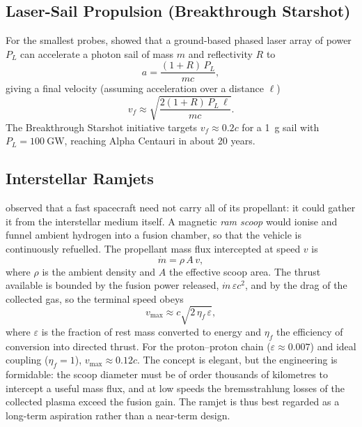 \documentclass[12pt,a4paper]{article}
\begin{document}
\subsection{Laser-Sail Propulsion (Breakthrough Starshot)}

For the smallest probes, \citet{Forward1984} showed that a ground-based phased
laser array of power $P_L$ can accelerate a photon sail of mass $m$ and
reflectivity $R$ to
\begin{equation}
  a = \frac{(1+R)\,P_L}{mc},
  \label{eq:laser_accel}
\end{equation}
giving a final velocity (assuming acceleration over a distance $\ell$)
\begin{equation}
  v_f \approx \sqrt{\frac{2(1+R)\,P_L\,\ell}{mc}}.
\end{equation}
The Breakthrough Starshot initiative targets $v_f \approx 0.2c$ for a
\SI{1}{\gram} sail with $P_L = \SI{100}{\giga\watt}$, reaching Alpha
Centauri in about 20 years.

\subsection{Interstellar Ramjets}

\citet{Bussard1960} observed that a fast spacecraft need not carry all of its
propellant: it could gather it from the interstellar medium itself. A magnetic
\emph{ram scoop} would ionise and funnel ambient hydrogen into a fusion
chamber, so that the vehicle is continuously refuelled. The propellant mass
flux intercepted at speed $v$ is
\begin{equation}
  \dot m = \rho\,A\,v,
  \label{eq:ram_flux}
\end{equation}
where $\rho$ is the ambient density and $A$ the effective scoop area. The
thrust available is bounded by the fusion power released,
$\dot m\,\varepsilon c^2$, and by the drag of the collected gas, so the
terminal speed obeys
\begin{equation}
  v_{\max} \approx c\sqrt{2\,\eta_f\,\varepsilon},
  \label{eq:ram_vmax}
\end{equation}
where $\varepsilon$ is the fraction of rest mass converted to energy and
$\eta_f$ the efficiency of conversion into directed thrust. For the
proton--proton chain ($\varepsilon \approx 0.007$) and ideal coupling
($\eta_f = 1$), $v_{\max} \approx 0.12c$. The concept is elegant, but the
engineering is formidable: the scoop diameter must be of order thousands of
kilometres to intercept a useful mass flux, and at low speeds the
bremsstrahlung losses of the collected plasma exceed the fusion gain. The
ramjet is thus best regarded as a long-term aspiration rather than a near-term
design.
\end{document}
